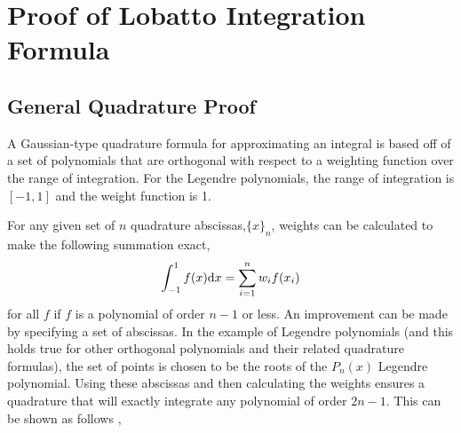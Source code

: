 
\section{Proof of Lobatto Integration Formula}
\label{lobatappend}

\subsection{General Quadrature Proof}
\label{genproof}
A Gaussian-type quadrature formula for approximating an integral is based off of
a set of polynomials that are orthogonal with respect to a weighting function over
the range of integration. For the Legendre polynomials, the range of integration is 
$[-1,1]$ and the weight function is 1. 

For any given set of $n$ quadrature abscissas,$\{x\}_n$, weights can be calculated to make
the following summation exact, 
\begin{equation}
\int_{-1}^{1} f(x){\rm d}x = \sum_{i=1}^nw_if(x_i)
\end{equation}
for all $f$ if $f$ is a polynomial of order $n-1$ or less. An improvement can be made
by specifying a set of abscissas. In the example of Legendre polynomials (and this holds
true for other orthogonal polynomials and their related quadrature formulas), the set
of points is chosen to be the roots of the $P_n(x)$ Legendre polynomial. Using these
abscissas and then calculating the weights ensures a quadrature that will exactly 
integrate any polynomial of order $2n-1$. This can be shown as follows
\cite{Burden_gaussquad}, 

